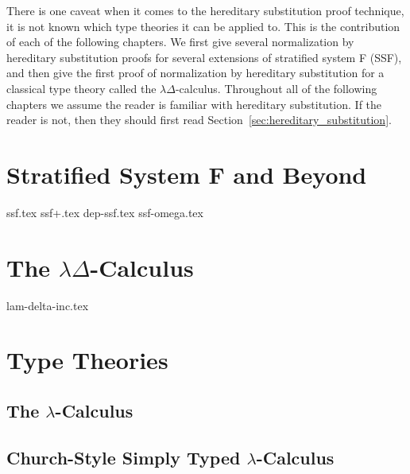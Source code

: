 \documentclass[phd,appendix,dedicationpage,ackpage,epigraphpage]{uithesis}
\begin{document}
There is one caveat when it comes to the hereditary substitution proof
technique, it is not known which type theories it can be applied to.
This is the contribution of each of the following chapters.  We first
give several normalization by hereditary substitution proofs for
several extensions of stratified system F (SSF), and then give the
first proof of normalization by hereditary substitution for a
classical type theory called the $\lambda\Delta$-calculus.  Throughout
all of the following chapters we assume the reader is familiar with
hereditary substitution.  If the reader is not, then they should first
read Section~\ref{sec:hereditary_substitution}.

\chapter{Stratified System F and Beyond}
\label{chap:stratified_system_f_and_beyond}
{ssf.tex}
{ssf+.tex}
{dep-ssf.tex}
{ssf-omega.tex}

\chapter{The $\lambda\Delta$-Calculus}
\label{chap:the_lambdadelta-calculus}
{lam-delta-inc.tex}


\appendix

\chapter{Type Theories}
\label{chap:type_theories}
\section{The $\lambda$-Calculus}
\label{sec:the_lambda-calculus}
\Lamall{}

\newpage
\section{Church-Style Simply Typed $\lambda$-Calculus}
\label{sec:church_style_simply_typed_lambda-calculus}
\CHSTLCall{}
\end{document}
